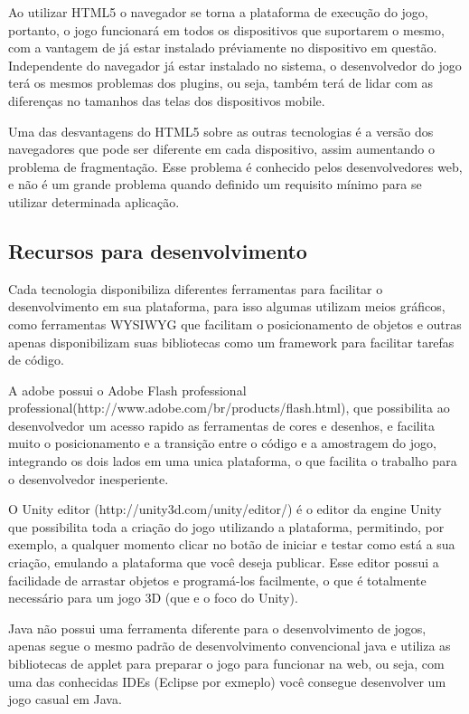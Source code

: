Ao utilizar HTML5 o navegador se torna a plataforma de execução do
jogo, portanto, o jogo funcionará em todos os dispositivos que
suportarem o mesmo, com a vantagem de já estar instalado préviamente
no dispositivo em questão.
Independente do navegador já estar instalado no sistema, o
desenvolvedor do jogo terá os mesmos problemas dos plugins, ou seja,
também terá de lidar com as diferenças no tamanhos das telas dos
dispositivos mobile.

Uma das desvantagens do HTML5 sobre as outras tecnologias é a versão
dos navegadores que pode ser diferente em cada dispositivo, assim
aumentando o problema de fragmentação. Esse problema é conhecido pelos
desenvolvedores web, e não é um grande problema quando definido um
requisito mínimo para se utilizar determinada aplicação.

\subsection{Recursos para desenvolvimento}

Cada tecnologia disponibiliza diferentes ferramentas para facilitar o
desenvolvimento em sua plataforma, para isso algumas utilizam meios
gráficos, como ferramentas WYSIWYG que facilitam o posicionamento de
objetos e outras apenas disponibilizam suas bibliotecas como um
framework para facilitar tarefas de código.

A adobe possui o Adobe Flash professional
professional(http://www.adobe.com/br/products/flash.html), que
possibilita ao desenvolvedor um acesso rapido as ferramentas de cores
e desenhos, e facilita muito o posicionamento e a transição entre o
código e a amostragem do jogo, integrando os dois lados em uma unica
plataforma, o que facilita o trabalho para o desenvolvedor
inesperiente.

O Unity editor (http://unity3d.com/unity/editor/) é o editor da engine Unity que possibilita toda a
criação do jogo utilizando a plataforma, permitindo, por exemplo, a
qualquer momento clicar no botão de iniciar e testar como está a sua
criação, emulando a plataforma que você deseja publicar.
Esse editor possui a facilidade de arrastar objetos e programá-los
facilmente, o que é totalmente necessário para um jogo 3D (que e o
foco do Unity).

Java não possui uma ferramenta diferente para o desenvolvimento de
jogos, apenas segue o mesmo padrão de desenvolvimento convencional
java e utiliza as bibliotecas de applet para preparar o jogo para
funcionar na web, ou seja, com uma das conhecidas IDEs (Eclipse por
exmeplo) você consegue desenvolver um jogo casual em Java.
